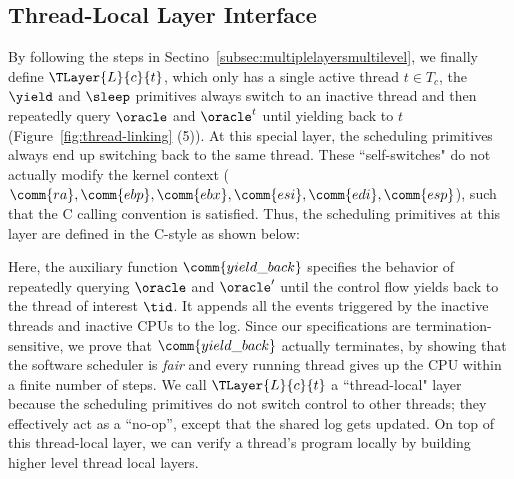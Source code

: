 \subsection{Thread-Local Layer Interface} \label{subsec:phthreadlayer}
By following the steps in Sectino~\ref{subsec:multiplelayersmultilevel}, 
we finally define $\TLayer{L}{c}{t}$,
which only has  a single active thread $t\in T_c$,
 the $\yield$ and $\sleep$ primitives  always
switch to an inactive thread and then repeatedly query $\oracle$ and $\oracle^t$
until yielding back to $t$ (Figure~\ref{fig:thread-linking} (5)).
At this special layer, the scheduling primitives
always  end up switching back to the same thread.
These ``self-switches" do not actually modify the kernel context 
($\comm{ra},
\comm{ebp}, \comm{ebx}, \comm{esi}, \comm{edi}, \comm{esp}$), 
such that the C calling convention is satisfied.
Thus, the scheduling primitives at this layer
are defined in the C-style as shown below:
\begin{small}
\begin{mathpar}
\end{mathpar}
\end{small}%
Here, the auxiliary function $\comm{yield\_back}$ 
specifies the behavior of repeatedly querying 
$\oracle$ and $\oracle'$ until the control flow yields back to the thread of interest $\tid$.
It appends all the events triggered by the inactive threads and inactive CPUs to the log.
Since our specifications are termination-sensitive,
we prove that $\comm{yield\_back}$ actually terminates,
by showing that the software scheduler is \emph{fair} and every running
thread gives up the CPU within a finite number of steps.
We call $\TLayer{L}{c}{t}$ a ``thread-local" layer 
because the scheduling primitives
do not switch control to other threads;
they effectively act as a ``no-op'',
except that the shared log gets updated.
On top of this thread-local layer,
we can verify a thread's program 
locally by building higher level thread local layers.



